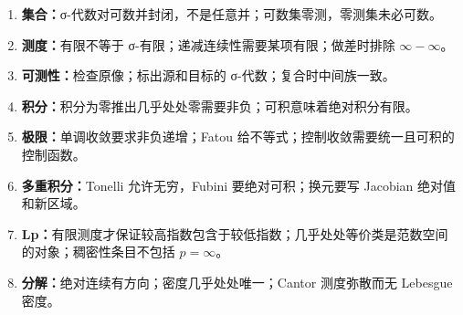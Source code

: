 \begin{enumerate}
\item \textbf{集合：}σ-代数对可数并封闭，不是任意并；可数集零测，零测集未必可数。
\item \textbf{测度：}有限不等于 σ-有限；递减连续性需要某项有限；做差时排除 $\infty-\infty$。
\item \textbf{可测性：}检查原像；标出源和目标的 σ-代数；复合时中间族一致。
\item \textbf{积分：}积分为零推出几乎处处零需要非负；可积意味着绝对积分有限。
\item \textbf{极限：}单调收敛要求非负递增；Fatou 给不等式；控制收敛需要统一且可积的控制函数。
\item \textbf{多重积分：}Tonelli 允许无穷，Fubini 要绝对可积；换元要写 Jacobian 绝对值和新区域。
\item \textbf{Lp：}有限测度才保证较高指数包含于较低指数；几乎处处等价类是范数空间的对象；稠密性条目不包括 $p=\infty$。
\item \textbf{分解：}绝对连续有方向；密度几乎处处唯一；Cantor 测度弥散而无 Lebesgue 密度。
\end{enumerate}
